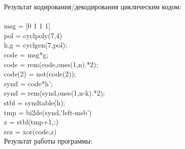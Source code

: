 \documentclass[12pt,a4paper]{report}
\begin{document}
Результат кодирования/декодирования циклическим кодом:\\\\
msg = [0 1 1 1]\\
pol = cyclpoly(7,4)\\
{h,g} = cyclgen(7,pol);\\
code = msg*g;\\
code = rem(code,ones(1,n).*2);\\
code(2) = not(code(2));\\
synd = code*h';\\
synd = rem(synd,ones(1,n-k).*2);\\
stbl = syndtable(h);\\
tmp = bi2de(synd,'left-msb')\\
z = stbl(tmp+1,:)\\
rez = xor(code,z)\\

Результат работы программы:
\begin{figure}[h!]
\end{figure}
\end{document}

